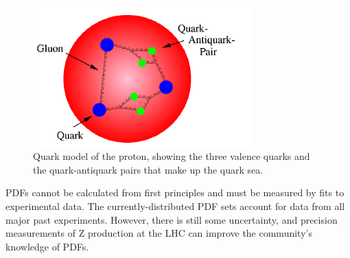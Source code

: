 
 \begin{figure}[htb]
  \begin{center}
    \includegraphics[width=240pt]{Figures/theory-quark-proton-naif-desy.png}
  \end{center}
  \caption[Quark model of proton]
	  {Quark model of the proton, 
	    showing the three valence quarks 
	    and the quark-antiquark pairs 
	    that make up the quark sea. 
	  }
  \label{fig:ProtonQuarkModel}
 \end{figure}



PDFs cannot be calculated from first 
principles and must be measured by fits 
to experimental data.  
The currently-distributed PDF sets 
account for data from all major past experiments.  
However, there is still some uncertainty, 
and precision measurements of Z production 
at the LHC can %
improve the community's knowledge of PDFs.  

